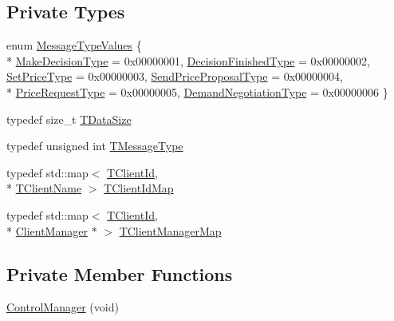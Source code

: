 \subsection*{Private Types}
\begin{DoxyCompactItemize}
\item 
enum \hyperlink{class_control_manager_a7b6de4a130e0de1729c7963edd972120}{Message\-Type\-Values} \{ \\*
\hyperlink{class_control_manager_a7b6de4a130e0de1729c7963edd972120afe62fd2d680bfeddc030a63944f8e513}{Make\-Decision\-Type} = 0x00000001, 
\hyperlink{class_control_manager_a7b6de4a130e0de1729c7963edd972120ae327aef118d20067ec6968987e76580d}{Decision\-Finished\-Type} = 0x00000002, 
\hyperlink{class_control_manager_a7b6de4a130e0de1729c7963edd972120ad0a806bbe260a48560eeeda4ffd855d6}{Set\-Price\-Type} = 0x00000003, 
\hyperlink{class_control_manager_a7b6de4a130e0de1729c7963edd972120ad493a309cdd6a23cc9e78a2e17eaf47d}{Send\-Price\-Proposal\-Type} = 0x00000004, 
\\*
\hyperlink{class_control_manager_a7b6de4a130e0de1729c7963edd972120afad3b5e04ece26c7ec3a5f388db53b43}{Price\-Request\-Type} = 0x00000005, 
\hyperlink{class_control_manager_a7b6de4a130e0de1729c7963edd972120a8adf22182deb49ea93b62097e2618cff}{Demand\-Negotiation\-Type} = 0x00000006
 \}
\item 
typedef size\-\_\-t \hyperlink{class_control_manager_a5c898e9e00806858a59700370560aea7}{T\-Data\-Size}
\item 
typedef unsigned int \hyperlink{class_control_manager_a36b60e90749624a648dc225c2c136397}{T\-Message\-Type}
\item 
typedef std\-::map$<$ \hyperlink{class_control_manager_a1bff13cab35db39c43f81f49b56e4849}{T\-Client\-Id}, \\*
\hyperlink{class_control_manager_ae9c86c5286c9ebf222ea44b60c463872}{T\-Client\-Name} $>$ \hyperlink{class_control_manager_a5f6aa6ca619f6aa8dddfc3d5000162f0}{T\-Client\-Id\-Map}
\item 
typedef std\-::map$<$ \hyperlink{class_control_manager_a1bff13cab35db39c43f81f49b56e4849}{T\-Client\-Id}, \\*
\hyperlink{class_client_manager}{Client\-Manager} $\ast$ $>$ \hyperlink{class_control_manager_a27b18022695359e2a4d5563f91b6befd}{T\-Client\-Manager\-Map}
\end{DoxyCompactItemize}
\subsection*{Private Member Functions}
\begin{DoxyCompactItemize}
\item 
\hyperlink{class_control_manager_ab81bac3e592705b7ca4b23ce473fe26e}{Control\-Manager} (void)
\end{DoxyCompactItemize}
